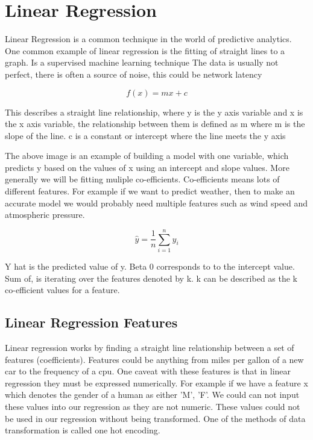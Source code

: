 \section{Linear Regression}

Linear Regression is a common technique in the world of predictive analytics. One common example of linear regression is the fitting of straight lines to a graph. 
Is a supervised machine learning technique
The data is usually not perfect, there is often a source of noise, this could be network latency

\begin{equation}
    f(x) = mx+c
\end{equation}

This describes a straight line relationship, where y is the y axis variable and x is the x axis variable, the relationship between them is defined as m where m is the slope of the line. c is a constant or intercept where the line meets the y axis

The above image is an example of building a model with one variable, which predicts y based on the values of x using an intercept and slope values. More generally we will be fitting muliple co-efficients. Co-efficients means lots of different features. For example if we want to predict weather, then to make an accurate model we would probably need multiple features such as wind speed and atmospheric pressure.

\begin{equation}
\hat{y} = \frac{1}{n}\sum_{i=1}^n y_i
\end{equation}

Y hat is the predicted value of y. Beta 0 corresponds to to the intercept value. Sum of, is iterating over the features denoted by k. k can be described as the k co-efficient values for a feature.

\subsection*{Linear Regression Features}

Linear regression works by finding a straight line relationship between a set of features (coefficients). Features could be anything from miles per gallon of a new car to the frequency of a cpu. One caveat with these features is that in linear regression they must be expressed numerically. For example if we have a feature x which denotes the gender of a human as either 'M', 'F'. We could can not input these values into our regression as they are not numeric. These values could not be used in our regression without being transformed. One of the methods of data transformation is called one hot encoding. 

